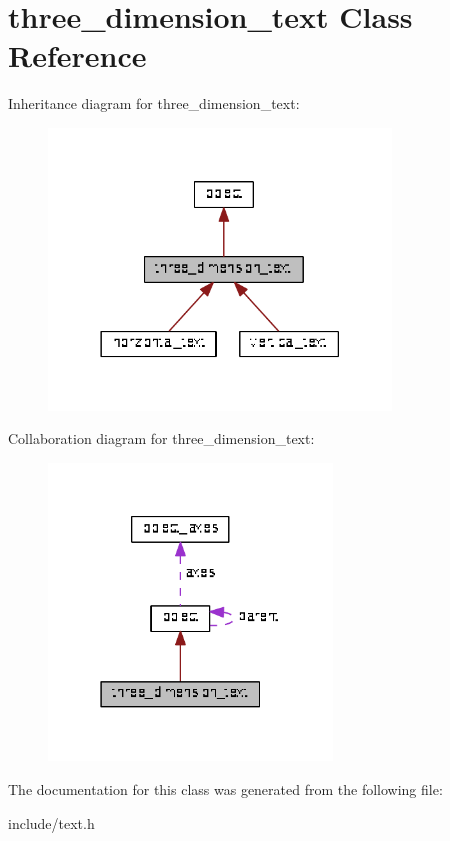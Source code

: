 \hypertarget{classthree__dimension__text}{}\section{three\+\_\+dimension\+\_\+text Class Reference}
\label{classthree__dimension__text}


Inheritance diagram for three\+\_\+dimension\+\_\+text\+:
\nopagebreak
\begin{figure}[H]
\begin{center}
\leavevmode
\includegraphics[width=258pt]{classthree__dimension__text__inherit__graph}
\end{center}
\end{figure}


Collaboration diagram for three\+\_\+dimension\+\_\+text\+:
\nopagebreak
\begin{figure}[H]
\begin{center}
\leavevmode
\includegraphics[width=214pt]{classthree__dimension__text__coll__graph}
\end{center}
\end{figure}


The documentation for this class was generated from the following file\+:\begin{DoxyCompactItemize}
\item 
include/text.\+h\end{DoxyCompactItemize}
